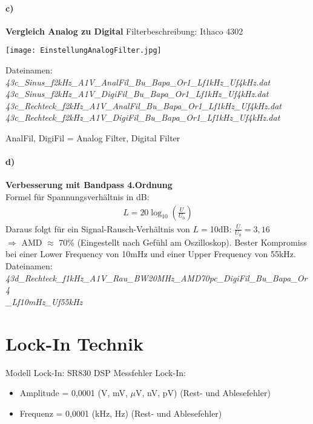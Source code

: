 \paragraph{c)}\textbf{Vergleich Analog zu Digital}
Filterbeschreibung: Ithaco 4302
\begin{center}
    \texttt{[image: EinstellungAnalogFilter.jpg]}
    \label{image:analogFilter}
\end{center}
Dateinamen:\\
\textit{43c\_Sinus\_f2kHz\_A1V\_AnalFil\_Bu\_Bapa\_Or1\_Lf1kHz\_Uf4kHz.dat}\\
\textit{43c\_Sinus\_f2kHz\_A1V\_DigiFil\_Bu\_Bapa\_Or1\_Lf1kHz\_Uf4kHz.dat}\\
\textit{43c\_Rechteck\_f2kHz\_A1V\_AnalFil\_Bu\_Bapa\_Or1\_Lf1kHz\_Uf4kHz.dat}\\
\textit{43c\_Rechteck\_f2kHz\_A1V\_DigiFil\_Bu\_Bapa\_Or1\_Lf1kHz\_Uf4kHz.dat}

AnalFil, DigiFil = Analog Filter, Digital Filter

\paragraph{d)}\textbf{Verbesserung mit Bandpass 4.Ordnung}\\
Formel für Spannungsverhältnis in dB:
\begin{gather}
    L = 20 \log_{10}\left(\frac{U}{U_0}\right)
\end{gather}
Daraus folgt für ein Signal-Rausch-Verhältnis von $L=$10dB: $\frac{U}{U_0} = 3,16$\\
$\Rightarrow$ AMD $\approx$ 70\% (Eingestellt nach Gefühl am Oszilloskop). Bester Kompromiss bei einer Lower Frequency von 10mHz und einer Upper Frequency von 55kHz.\\
Dateinamen:\\
\textit{43d\_Rechteck\_f1kHz\_A1V\_Rau\_BW20MHz\_AMD70pc\_DigiFil\_Bu\_Bapa\_Or4\\
\_Lf10mHz\_Uf55kHz}
\newpage
\section*{Lock-In Technik}
Modell Lock-In: SR830 DSP
Messfehler Lock-In:
\begin{itemize}
    \item Amplitude = 0,0001 (V, mV, $\mu$V, nV, pV) (Rest- und Ablesefehler)
    \item Frequenz = 0,0001 (kHz, Hz) (Rest- und Ablesefehler)
\end{itemize}
